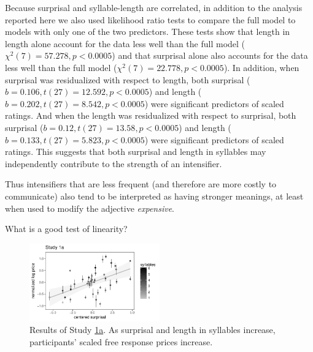 \documentclass[10pt,letterpaper]{article}
\newcommand{\todo}[1]{{\color{red}#1}}
\newcommand{\ndg}[1]{{\color{green}#1}}
\begin{document}
Because surprisal and syllable-length are correlated, in addition to the analysis reported here we also used likelihood ratio tests to compare the full model to models with only one of the two predictors.
These tests show that length in length alone account for the data less well than the full model ($\chi^2(7)=57.278, p<0.0005$) and that surprisal alone also accounts for the data less well than the full model ($\chi^2(7)=22.778, p<0.0005$).
In addition, when surprisal was residualized with respect to length, both surprisal ($b=0.106, t(27)=12.592, p<0.0005$) and length ($b=0.202, t(27)=8.542, p<0.0005$) were significant predictors of scaled ratings. And when the length was residualized with respect to surprisal, both surprisal ($b=0.12, t(27)=13.58, p<0.0005$) and length ($b=0.133, t(27)=5.823, p<0.0005$) were significant predictors of scaled ratings.
This suggests that both surprisal and length in syllables may independently contribute to the strength of an intensifier.

Thus intensifiers that are less frequent (and therefore are more costly to communicate) also tend to be interpreted as having stronger meanings, at least when used to modify the adjective \emph{expensive}.

\todo{What is a good test of linearity?}


\begin{figure}[ht]
\begin{center}
\includegraphics[width=0.5\textwidth]{images/plot_study1a.pdf}
\end{center}
\caption{Results of Study \hyperref[sec:study1a]{1a}. As surprisal and length in syllables increase, participants' scaled free response prices increase.} 
\label{fig:plot_study1a}
\end{figure}
\end{document}
